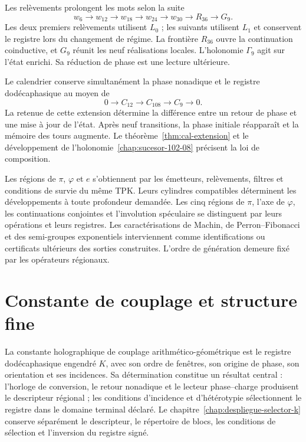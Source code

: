 Les relèvements prolongent les mots selon la suite
\[
 w_6\longrightarrow w_{12}\longrightarrow w_{18}
 \longrightarrow w_{24}\longrightarrow w_{30}
 \longrightarrow R_{36}\longrightarrow G_9.
\]
Les deux premiers relèvements utilisent \(L_0\) ; les suivants utilisent \(L_1\) et conservent le registre lors du changement de régime. La frontière \(R_{36}\) ouvre la continuation coinductive, et \(G_9\) réunit les neuf réalisations locales. L’holonomie \(\Gamma_9\) agit sur l’état enrichi. Sa réduction de phase est une lecture ultérieure.

Le calendrier conserve simultanément la phase nonadique et le registre dodécaphasique au moyen de
\[
 0\longrightarrow C_{12}\longrightarrow C_{108}
 \longrightarrow C_9\longrightarrow0.
\]
La retenue de cette extension détermine la différence entre un retour de phase et une mise à jour de l’état. Après neuf transitions, la phase initiale réapparaît et la mémoire des tours augmente. Le théorème~\ref{thm:cal-extension} et le développement de l’holonomie~\ref{chap:sucesor-102-08} précisent la loi de composition.

Les régions de \(\pi\), \(\varphi\) et \(e\) s’obtiennent par les émetteurs, relèvements, filtres et conditions de survie du même TPK. Leurs cylindres compatibles déterminent les développements à toute profondeur demandée. Les cinq régions de \(\pi\), l’axe de \(\varphi\), les continuations conjointes et l’involution spéculaire se distinguent par leurs opérations et leurs registres. Les caractérisations de Machin, de Perron--Fibonacci et des semi-groupes exponentiels interviennent comme identifications ou certificats ultérieurs des sorties construites. L’ordre de génération demeure fixé par les opérateurs régionaux.

\section*{Constante de couplage et structure fine}

La constante holographique de couplage arithmético-géométrique est le registre dodécaphasique engendré \(K\), avec son ordre de fenêtres, son origine de phase, son orientation et ses incidences. Sa détermination constitue un résultat central : l’horloge de conversion, le retour nonadique et le lecteur phase--charge produisent le descripteur régional ; les conditions d’incidence et d’hétérotypie sélectionnent le registre dans le domaine terminal déclaré. Le chapitre~\ref{chap:despliegue-selector-k} conserve séparément le descripteur, le répertoire de blocs, les conditions de sélection et l’inversion du registre signé.

